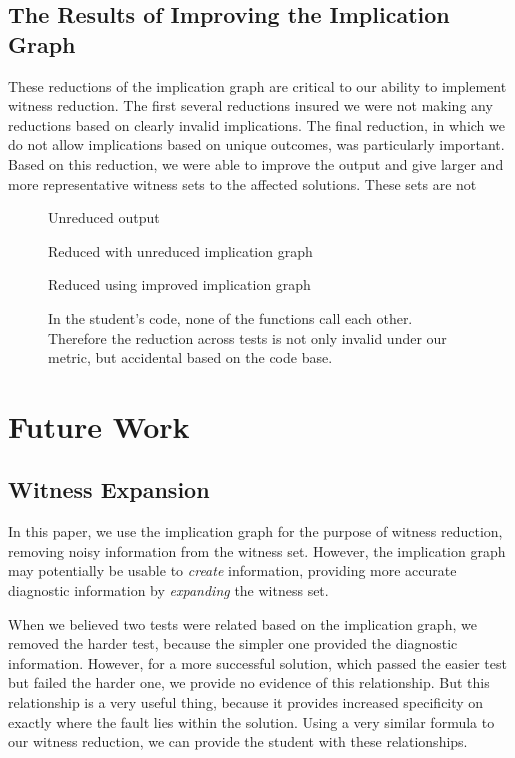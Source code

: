 \documentclass[11pt,twoside]{article}
\theoremstyle{definition}
\begin{document}
\subsection{The Results  of Improving the Implication Graph}

These reductions of the implication graph are critical to our ability to implement witness reduction. The first several reductions insured we were not making any reductions based on clearly invalid implications. The final reduction, in which we do not allow implications based on unique outcomes, was particularly important. Based on this reduction, we were able to improve the output and give larger and more representative witness sets to the affected solutions. These sets are not 

\begin{figure}

\caption{Unreduced output}

\caption{Reduced with unreduced implication graph}

\caption{Reduced using improved implication graph}
\caption{In the student's code, none of the functions call each other. Therefore the reduction across tests is not only invalid under our metric, but accidental based on the code base.}
\end{figure}

\section{Future Work}
\subsection{Witness Expansion}

In this paper, we use the implication graph for the purpose of witness reduction, removing noisy information from the witness set. However, the implication graph may potentially be usable to \emph{create} information, providing more accurate diagnostic information by \emph{expanding} the witness set. 

When we believed two tests were related based on the implication graph, we removed the harder test, because the simpler one provided the diagnostic information. However, for a more successful solution, which passed the easier test but failed the harder one, we provide no evidence of this relationship. But this relationship is a very useful thing, because it provides increased specificity on exactly where the fault lies within the solution. Using a very similar formula to our witness reduction, we can provide the student with these relationships.
\end{document}
